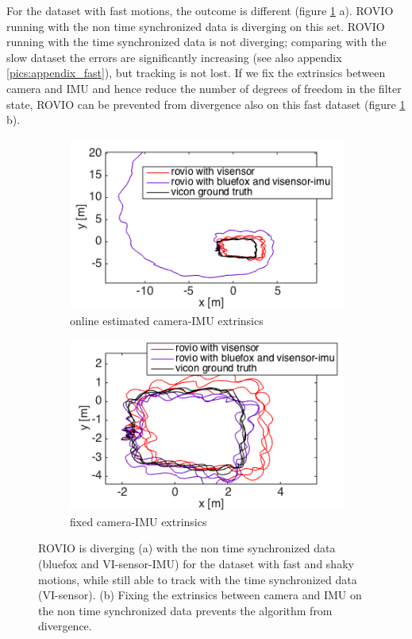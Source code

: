 For the dataset with fast motions, the outcome is different (figure \ref{pics:timesync_fast} a). ROVIO running with the non time synchronized data is diverging on this set. ROVIO running with the time synchronized data is not diverging; comparing with the slow dataset the errors are significantly increasing (see also appendix \ref{pics:appendix_fast}), but tracking is not lost. If we fix the extrinsics between camera and IMU and hence reduce the number of degrees of freedom in the filter state, ROVIO can be prevented from divergence also on this fast dataset (figure \ref{pics:timesync_fast} b). \\

\begin{figure}
  \begin{subfigure}[b]{0.48\textwidth}
    \includegraphics[width=\textwidth]{images/fast_2D.png}
    \caption{online estimated camera-IMU extrinsics}
  \end{subfigure}
  \hfill
  \begin{subfigure}[b]{0.48\textwidth}
    \includegraphics[width=\textwidth]{images/fast_fixed_2D.png}
    \caption{fixed camera-IMU extrinsics}
  \end{subfigure}
   \caption{ROVIO is diverging (a) with the non time synchronized data (bluefox and VI-sensor-IMU) for the dataset with fast and shaky motions, while still able to track with the time synchronized data (VI-sensor). (b) Fixing the extrinsics between camera and IMU on the non time synchronized data prevents the algorithm from divergence.}
   \label{pics:timesync_fast}
\end{figure}

